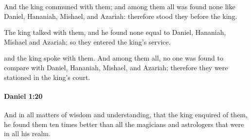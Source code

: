 			\begin{versebox}
					\item[BHS] 
					\item[LXX] 
					\item[ASV] And the king communed with them; and among them all was found none like Daniel, Hananiah, Mishael, and Azariah: therefore stood they before the king.
					\item[NIV] The king talked with them, and he found none equal to Daniel, Hananiah, Mishael and Azariah; so they entered the king’s service.
					\item[NRSV] and the king spoke with them. And among them all, no one was found to compare with Daniel, Hananiah, Mishael, and Azariah; therefore they were stationed in the king’s court.
			\end{versebox}

		\paragraph{Daniel 1:20} %
			\label{DANIEL-1-20}

			And in all matters of wisdom and understanding, that the king enquired of them, he found them ten times better than all the magicians and astrologers that were in all his realm.

